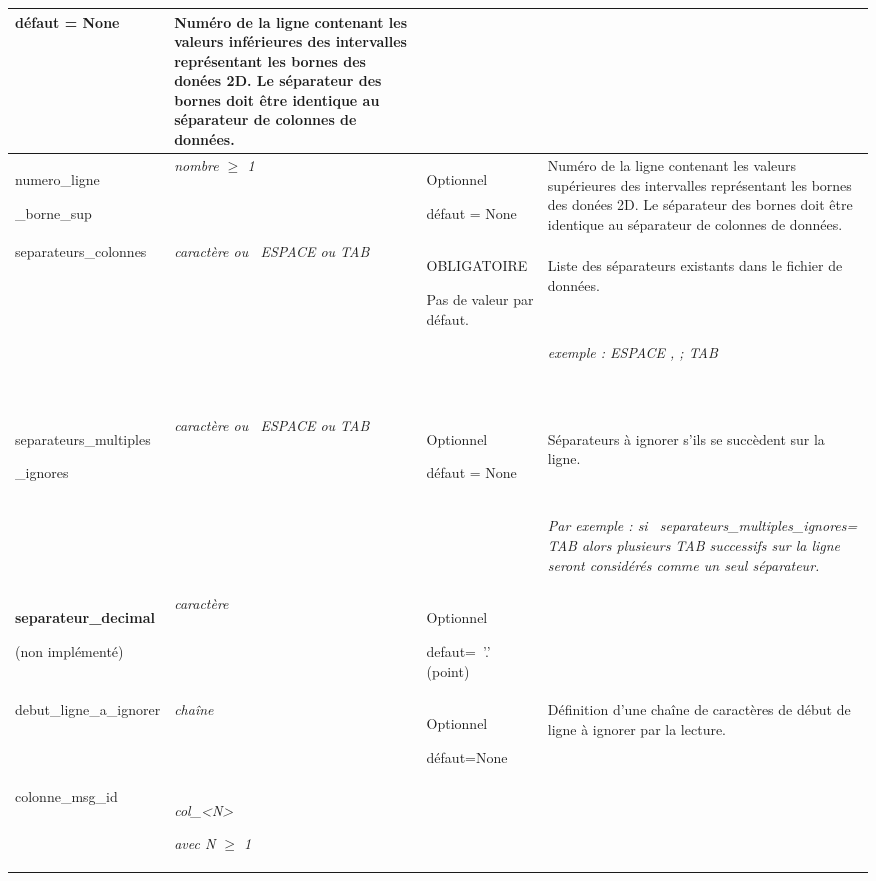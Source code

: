 \begin{center}
\begin{supertabular}{|p{3.592cm}|p{2.116cm}|p{4.099cm}|p{5.393cm}|}
défaut = None &
Numéro de la ligne contenant les valeurs inférieures des intervalles représentant les bornes des donées 2D. Le
séparateur des bornes doit être identique au séparateur de colonnes de données.\\\hline
numero\_ligne

\_borne\_sup  &
{\itshape nombre ${\geq}$ 1} &
Optionnel

défaut = None &
Numéro de la ligne contenant les valeurs supérieures des intervalles représentant les bornes des donées 2D. Le
séparateur des bornes doit être identique au séparateur de colonnes de données.\\\hline
{\color{black} separateurs\_colonnes} &
{\color{black} \textit{c}\textit{aractère}\textit{\textcolor[rgb]{0.4,0.4,1.0}{ }}\textit{ou \ ESPACE ou TAB}} &
{\color{black} OBLIGATOIRE}

{\color{black} Pas de valeur par défaut.} &
{\color{black} Liste des séparateurs existants dans le fichier de données.}


~

{\itshape\color{black} exemple : ESPACE , ; TAB}

~
\\\hline
{\color{black} separateurs\_multiples}

{\color{black} \_ignores} &
{\color{black} \textit{c}\textit{aractère}\textit{\textcolor[rgb]{0.4,0.4,1.0}{ }}\textit{ou \ ESPACE ou TAB}} &
{\color{black} Optionnel}

{\color{black} défaut = None} &
{\color{black} Séparateurs à ignorer s'ils se succèdent sur la ligne.}

~

{\itshape\color{black} Par exemple : si~ separateurs\_multiples\_ignores= TAB alors plusieurs TAB successifs sur la
ligne seront considérés comme un seul séparateur. }\\\hline
{\bfseries\color{black} separateur\_decimal} 

(non implémenté)&
{\itshape\color{black} caractère} &
{\color{black} Optionnel}

{\color{black} defaut=~'.' (point)} &
~
\\\hline
debut\_ligne\_a\_ignorer &
{\itshape chaîne} &
Optionnel

défaut=None &
Définition d{}'une chaîne de caractères de début de ligne à ignorer par la lecture.\\\hline
colonne\_msg\_id &
{\itshape col\_{\textless}N{\textgreater}}

{\itshape avec N ${\geq}$ 1}


\end{supertabular}
\end{center}
